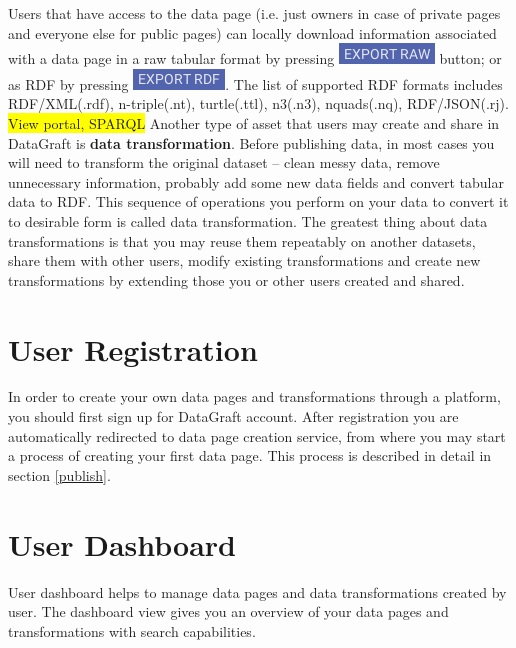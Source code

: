 \documentclass[USenglish]{article}
\begin{document}
Users that have access to the data page (i.e. just owners in case of private pages and everyone else for public pages) can locally download information associated with a data page in a raw tabular format by pressing {\includegraphics[scale=0.8]{exportraw.png}} button; or as RDF by pressing {\includegraphics[scale=0.8]{exportrdf.png}}. The list of supported RDF formats includes RDF/XML(.rdf), n-triple(.nt), turtle(.ttl), n3(.n3), nquads(.nq), RDF/JSON(.rj).
  \colorbox{yellow}{View portal, SPARQL} 
\newline
\newline
Another type of asset that users may create and share in DataGraft is \textbf{data transformation}. Before publishing data, in most cases you will need to transform the original dataset -- clean messy data, remove unnecessary information, probably add some new data fields and convert tabular data to RDF. This sequence of operations you perform on your data to convert it to desirable form is called data transformation. The greatest thing about data transformations is that you may reuse them repeatably on another datasets, share them with other users, modify existing transformations and create new transformations by extending those you or other users created and shared.
\section{User Registration}
In order to create your own data pages and transformations through a platform, you should first sign up for DataGraft account. After registration you are automatically redirected to data page creation service, from where you may start a process of creating your first data page. This process is described in detail in section \ref{publish}.

\section{User Dashboard}
User dashboard helps to manage data pages and data transformations created by user.  The dashboard view gives you an overview of your data pages and transformations with search capabilities. 
\end{document}
